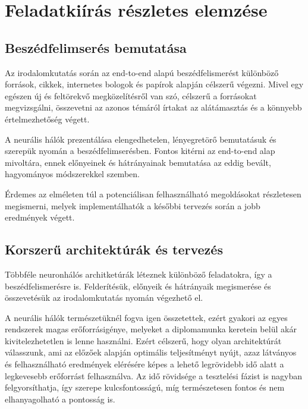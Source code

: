 \chapter{Feladatkiírás részletes elemzése}

\section{Beszédfelimserés bemutatása}

Az irodalomkutatás során az end-to-end alapú beszédfelismerést különböző források, cikkek, internetes bologok és papírok alapján célszerű végezni. Mivel egy egészen új és feltörekvő megközelítésről van szó, célszerű a forrásokat megvizsgálni, összevetni az azonos témáról írtakat az alátámasztás és a könnyebb értelmezhetőség végett.

A neurális hálók prezentálása elengedhetelen, lényegretörő bemutatásuk és szerepük nyomán a beszédfelimserésben. Fontos kitérni az end-to-end alap mivoltára, ennek előnyeinek és hátrányainak bemutatása az eddig bevált, hagyományos módszerekkel szemben.

Érdemes az elméleten túl a potenciálisan felhasználható megoldásokat részletesen megismerni, melyek implementálhatók a későbbi tervezés során a jobb eredmények végett.

\section{Korszerű architektúrák és tervezés}

Többféle neuronhálós architketúrák léteznek különböző feladatokra, így a beszédfelismerésre is. Felderítésük, előnyeik és hátrányaik megismerése és összevetésük az irodalomkutatás nyomán végezhető el. 

A neurális hálók természetüknél fogva igen összetettek, ezért gyakori az egyes rendszerek magas erőforrásigénye, melyeket a diplomamunka keretein belül akár kivitelezhetetlen is lenne használni. Ezért célszerű, hogy olyan architektúrát válasszunk, ami az előzőek alapján optimális teljesítményt nyújt, azaz látványos és felhasználható eredmények elérésére képes a lehető legrövidebb idő alatt a legkevesebb erőforrást felhasználva. Az idő rövidsége a tesztelési fázist is nagyban felgyorsíthatja, így szerepe kulcsfontosságú, míg természetesen fontos és nem elhanyagolható a pontosság is.

